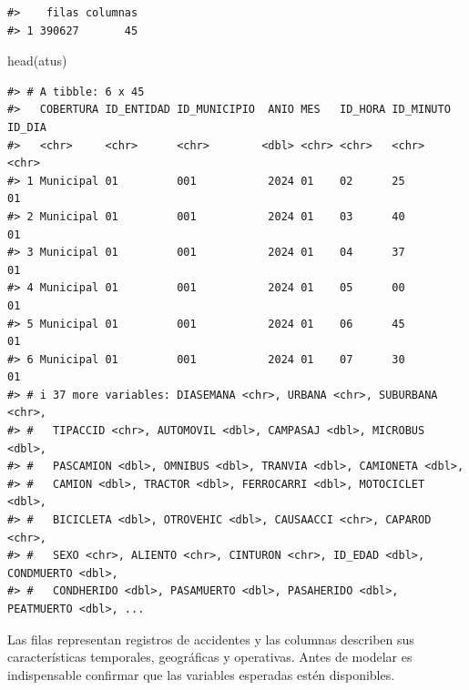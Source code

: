 \documentclass[
  spanish,
  10.5pt,
  letterpaper,
  openany,
  headings=big]{scrbook}
\newenvironment{Shaded}{}{}
\newcommand{\FunctionTok}[1]{\textcolor[rgb]{0.44,0.26,0.76}{#1}}
\newcommand{\NormalTok}[1]{\textcolor[rgb]{0.14,0.16,0.18}{#1}}
\begin{document}
\begin{verbatim}
#>    filas columnas
#> 1 390627       45
\end{verbatim}

\begin{Shaded}
\begin{Highlighting}[]
\FunctionTok{head}\NormalTok{(atus)}
\end{Highlighting}
\end{Shaded}

\begin{verbatim}
#> # A tibble: 6 x 45
#>   COBERTURA ID_ENTIDAD ID_MUNICIPIO  ANIO MES   ID_HORA ID_MINUTO ID_DIA
#>   <chr>     <chr>      <chr>        <dbl> <chr> <chr>   <chr>     <chr> 
#> 1 Municipal 01         001           2024 01    02      25        01    
#> 2 Municipal 01         001           2024 01    03      40        01    
#> 3 Municipal 01         001           2024 01    04      37        01    
#> 4 Municipal 01         001           2024 01    05      00        01    
#> 5 Municipal 01         001           2024 01    06      45        01    
#> 6 Municipal 01         001           2024 01    07      30        01    
#> # i 37 more variables: DIASEMANA <chr>, URBANA <chr>, SUBURBANA <chr>,
#> #   TIPACCID <chr>, AUTOMOVIL <dbl>, CAMPASAJ <dbl>, MICROBUS <dbl>,
#> #   PASCAMION <dbl>, OMNIBUS <dbl>, TRANVIA <dbl>, CAMIONETA <dbl>,
#> #   CAMION <dbl>, TRACTOR <dbl>, FERROCARRI <dbl>, MOTOCICLET <dbl>,
#> #   BICICLETA <dbl>, OTROVEHIC <dbl>, CAUSAACCI <chr>, CAPAROD <chr>,
#> #   SEXO <chr>, ALIENTO <chr>, CINTURON <chr>, ID_EDAD <dbl>, CONDMUERTO <dbl>,
#> #   CONDHERIDO <dbl>, PASAMUERTO <dbl>, PASAHERIDO <dbl>, PEATMUERTO <dbl>, ...
\end{verbatim}

\begin{tcolorbox}[enhanced jigsaw, arc=.35mm, bottomrule=.15mm, bottomtitle=1mm, breakable, colback=white, colbacktitle=quarto-callout-tip-color!10!white, colframe=quarto-callout-tip-color-frame, coltitle=black, left=2mm, leftrule=.75mm, opacityback=0, opacitybacktitle=0.6, rightrule=.15mm, title=\textcolor{quarto-callout-tip-color}{\faLightbulb}\hspace{0.5em}{Interpretación}, titlerule=0mm, toprule=.15mm, toptitle=1mm]

Las filas representan registros de accidentes y las columnas describen
sus características temporales, geográficas y operativas. Antes de
modelar es indispensable confirmar que las variables esperadas estén
disponibles.

\end{tcolorbox}
\end{document}

